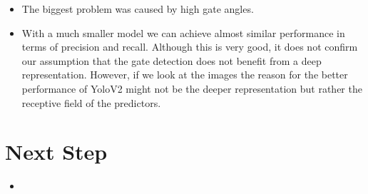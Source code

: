 \documentclass{article}
\begin{document}
\begin{itemize}
	\item The biggest problem was caused by high gate angles.
	\item With a much smaller model we can achieve almost similar performance in terms of precision and recall. Although this is very good, it does not confirm our assumption that the gate detection does not benefit from a deep representation. However, if we look at the images the reason for the better performance of YoloV2 might not be the deeper representation but rather the receptive field of the predictors.
\end{itemize}

\section{Next Step}
\begin{itemize}
	\item
\end{itemize}







\end{document}
